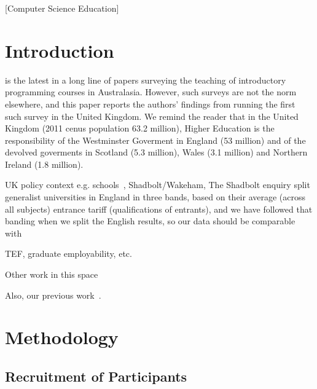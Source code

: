 \documentclass{sig-alternate}
\begin{document}
[Computer Science Education]

\section{Introduction}\label{intro}

\cite{mason+cooper:2014} is the latest in a long line \cite{deraadt-et-al:2004,mason-et-al:2012} of papers surveying the teaching of introductory programming courses in Australasia. However, such surveys are not the norm elsewhere, and this paper reports the authors' findings from running the first such survey in the United Kingdom. We remind the reader that in the United Kingdom (2011 cenus population 63.2 million), %
Higher Education is the responsibility of the Westminster Goverment in England (53 million) and of the devolved goverments in Scotland (5.3 million), Wales (3.1 million) and Northern Ireland (1.8 million).

UK policy context
e.g. schools~\cite{brown-et-al-sigcse2013,brown-et-al-toce2014},
Shadbolt/Wakeham,
The Shadbolt enquiry split generalist universities in England in three bands, based on their average (across all subjects) entrance tariff (qualifications of entrants), and we have followed that banding when we split the English results, so our data should be comparable with \cite{shadbolt:2016}

 TEF, graduate employability, etc.

Other work in this
space~\cite{mccracken-et-al:2001,gupta:2004,dale:2006,pears-et-al:2007,guo:2014}

Also, our previous work~\cite{crick-et-al-hea:2015,davenport-et-al:latice2016}.


\section{Methodology}\label{method}

\subsection{Recruitment of Participants}
\end{document}
